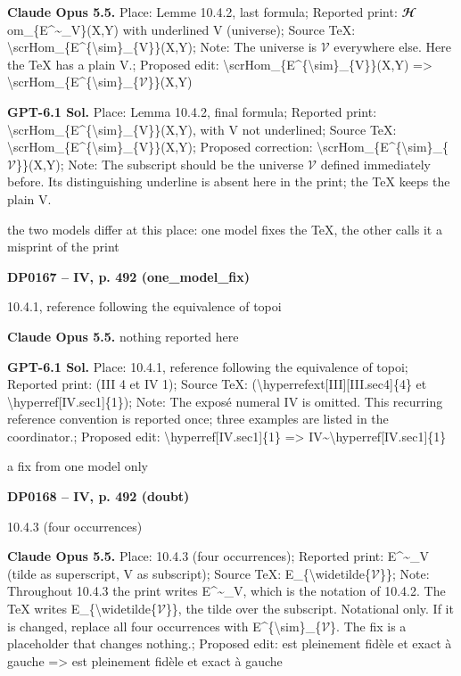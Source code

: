 \textbf{Claude Opus 5.5.} Place: Lemme 10.4.2, last formula; Reported print: \ensuremath{𝓗}om\_\{E\textasciicircum{}\textasciitilde{}\_V\}(X,Y) with underlined V (universe); Source TeX: \textbackslash{}scrHom\_\{E\textasciicircum{}\{\textbackslash{}sim\}\_\{V\}\}(X,Y); Note: The universe is \ensuremath{𝒱} everywhere else. Here the TeX has a plain V.; Proposed edit: \textbackslash{}scrHom\_\{E\textasciicircum{}\{\textbackslash{}sim\}\_\{V\}\}(X,Y) =\allowbreak > \textbackslash{}scrHom\_\{E\textasciicircum{}\{\textbackslash{}sim\}\_\{\ensuremath{𝒱}\}\}(X,Y)\par
\textbf{GPT-6.1 Sol.} Place: Lemma 10.4.2, final formula; Reported print: \textbackslash{}scrHom\_\{E\textasciicircum{}\{\textbackslash{}sim\}\_\{V\}\}(X,Y), with V not underlined; Source TeX: \textbackslash{}scrHom\_\{E\textasciicircum{}\{\textbackslash{}sim\}\_\{V\}\}(X,Y); Proposed correction: \textbackslash{}scrHom\_\{E\textasciicircum{}\{\textbackslash{}sim\}\_\{\ensuremath{𝒱}\}\}(X,Y); Note: The subscript should be the universe \ensuremath{𝒱} defined immediately before. Its distinguishing underline is absent here in the print; the TeX keeps the plain V.\par
the two models differ at this place: one model fixes the TeX, the other calls it a misprint of the print\par
\par\noindent\hypertarget{DP0167}{}\textbf{DP0167 -- IV, p. 492 (one\_model\_fix)}\par
10.4.1, reference following the equivalence of topoi\par
\textbf{Claude Opus 5.5.} nothing reported here\par
\textbf{GPT-6.1 Sol.} Place: 10.4.1, reference following the equivalence of topoi; Reported print: (III 4 et IV 1); Source TeX: (\textbackslash{}hyperrefext[III][III.sec4]\{4\} et \textbackslash{}hyperref[IV.sec1]\{1\}); Note: The exposé numeral IV is omitted. This recurring reference convention is reported once; three examples are listed in the coordinator.; Proposed edit: \textbackslash{}hyperref[IV.sec1]\{1\} =\allowbreak > IV\textasciitilde{}\textbackslash{}hyperref[IV.sec1]\{1\}\par
a fix from one model only\par
\par\noindent\hypertarget{DP0168}{}\textbf{DP0168 -- IV, p. 492 (doubt)}\par
10.4.3 (four occurrences)\par
\textbf{Claude Opus 5.5.} Place: 10.4.3 (four occurrences); Reported print: E\textasciicircum{}\textasciitilde{}\_V (tilde as superscript, V as subscript); Source TeX: E\_\{\textbackslash{}widetilde\{\ensuremath{𝒱}\}\}; Note: Throughout 10.4.3 the print writes E\textasciicircum{}\textasciitilde{}\_V, which is the notation of 10.4.2. The TeX writes E\_\{\textbackslash{}widetilde\{\ensuremath{𝒱}\}\}, the tilde over the subscript. Notational only. If it is changed, replace all four occurrences with E\textasciicircum{}\{\textbackslash{}sim\}\_\{\ensuremath{𝒱}\}. The fix is a placeholder that changes nothing.; Proposed edit: est pleinement fidèle et exact à gauche =\allowbreak > est pleinement fidèle et exact à gauche\par

